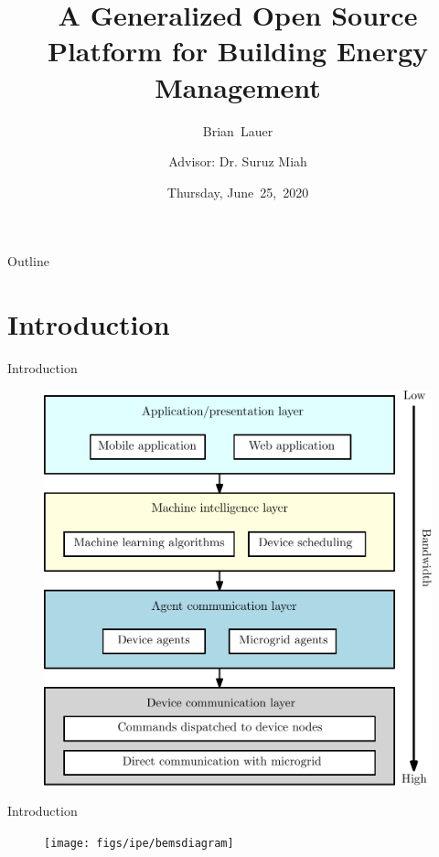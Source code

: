 \documentclass{beamer}
\title[Progress Update]{A Generalized Open Source Platform for Building Energy Management}
\author[B.~Lauer]{Brian~Lauer\\\and
Advisor: Dr. Suruz Miah}
\institute[Bradley University] %
{
  Department of Electrical and Computer Engineering\\
  Bradley University\\
  1501 W. Bradley Avenue\\
  Peoria, IL, 61625, USA
}
\date[June~25,~2020]{Thursday, June~25,~2020}
\begin{document}
\begin{frame}
  \titlepage
\end{frame}

\begin{frame}{Outline}
  \tableofcontents
\end{frame}

\section{Introduction}

\begin{frame}{Introduction}{}
  \begin{figure}
  \includegraphics[scale=0.35]{figs/ipe/BEMS-softwareArchitecture}
  \end{figure}
\end{frame}

\begin{frame}{Introduction}{}
  \begin{figure}
  \texttt{[image: figs/ipe/bemsdiagram]}
  \end{figure}
\end{frame}
\end{document}
